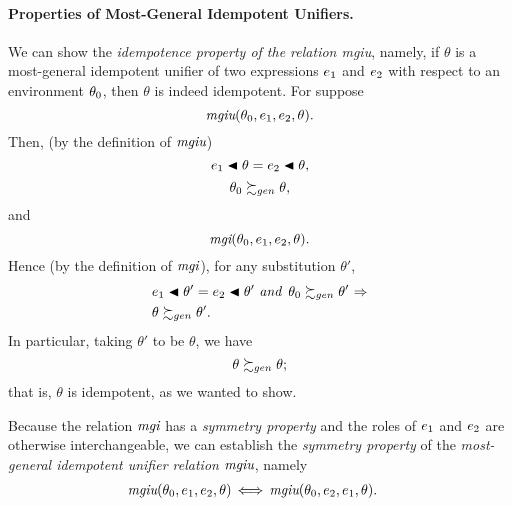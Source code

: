 \documentclass[runningheads]{llncs}
\DeclareMathOperator{\uand}{\emph{and}\,}
\DeclareMathOperator{\uimplies}{\Rightarrow}
\DeclareMathOperator{\uiff}{\iff}
\DeclareMathOperator{\mgi}{\emph{mgi}}
\DeclareMathOperator{\mgiu}{\emph{mgiu}}
\begin{document}
 \paragraph{Properties of Most-General Idempotent Unifiers.}  We can  show the \emph{idempotence property of the relation mgiu}, namely, if $\theta$ is a most-general idempotent unifier of two expressions $e_{1}$ and $e_{2}$ with respect to an environment $\theta_{0}$, then $\theta$ is indeed idempotent.  For suppose 
   \[\mgiu(\thet{0}, \e{1}, \e{2}, \theta).\]
Then, (by the definition of $\mgiu$)
      \[e_{1} \blacktriangleleft \theta = e_{2} \blacktriangleleft \theta, \]
      \[\theta_{0} \succsim_{gen} \theta, \]  
            and
      \[{\mgi}(\thet{0}, \e{1}, \e{2}, \theta).\]
Hence (by the definition of $\mgi$), for any substitution $\theta'$, 
\[
 \begin {aligned} &\e{1} \apply \theta' = \e{2} \apply \theta' \, \uand \,   
  \thet{0} \moregen \theta' \,\uimplies\\
                    &\theta \moregen \theta'.
   \end{aligned}
   \]
In particular, taking $\theta'$ to be $\theta$, we have
   \[\theta \succsim_{gen} \theta;\]
that is, $\theta$ is idempotent, as we wanted to show.


   Because the relation $\mgi$ has a \emph{symmetry property} and the roles of $e_{1}$ and $e_{2}$ are otherwise interchangeable, we can establish the \emph{symmetry property} of the \emph{most-general idempotent unifier relation} $\mgiu$, namely
    \begin{align*} 
 {\mgiu}(&\thet{0}, \e{1}, \e{2}, \theta) \uiff 
 {\mgiu}(\thet{0}, \e{2}, \e{1}, \theta). 
 \end{align*}
\end{document}
